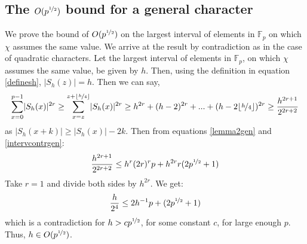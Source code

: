 \documentclass{report}
\begin{document}
\subsection{The $O(p^{\nicefrac{1}{2}})$ bound for a general character}
We prove the bound of $O(p^{\nicefrac{1}{2}})$ on the largest interval of elements in $\mathbb{F}_p$ on which $\chi$ assumes the same value. We arrive at the result by contradiction as in the case of quadratic characters. Let the largest interval of elements in $\mathbb{F}_p$, on which $\chi$ assumes the same value, be given by $h$. Then, using the definition in equation \ref{definesh}, $\lvert S_h(z)\rvert=h$. Then we can say,
\begin{equation} \label{intervcontrgen}
\sum\limits_{x=0}^{p-1}\lvert S_h(x)\rvert^{2r}\geq\sum\limits_{x=z}^{z+\lfloor\nicefrac{h}{4}\rfloor}\lvert S_h(x)\rvert^{2r} \geq h^{2r}+(h-2)^{2r}+...+(h-2\lfloor\nicefrac{h}{4}\rfloor)^{2r} \geq \frac{h^{2r+1}}{2^{2r+2}}
\end{equation}
as $\lvert S_h(x+k)\rvert \geq \lvert S_h(x)\rvert-2k$. Then from equations \ref{lemma2gen} and \ref{intervcontrgen}:
$$ \frac{h^{2r+1}}{2^{2r+2}} \leq h^{r}(2r)^{r}p+h^{2r}r(2p^{\nicefrac{1}{2}}+1)$$
Take $r=1$ and divide both sides by $h^{2r}$. We get:
\begin{equation} \label{contreq}
\frac{h}{2^{4}} \leq 2h^{-1}p+(2p^{\nicefrac{1}{2}}+1)
\end{equation}
which is a contradiction for $h>cp^{\nicefrac{1}{2}}$, for some constant $c$, for large enough $p$. Thus, $h\in O(p^{\nicefrac{1}{2}})$.
\end{document}
